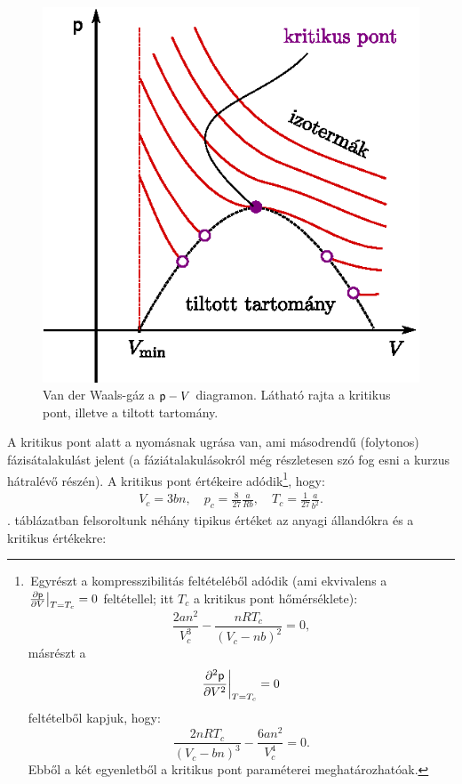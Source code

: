 \begin{figure}[htb]
    \centering
    \includegraphics{termo_4/termo_4_7.eps}
    \caption{Van der Waals-gáz a $\mathsf p-V$ diagramon. Látható rajta a kritikus pont, illetve a tiltott tartomány.}
    \label{fig:termo_4_7}
\end{figure}
A kritikus pont alatt a nyomásnak ugrása van, ami másodrendű (folytonos) fázisátalakulást jelent (a fáziátalakulásokról még részletesen szó fog esni a kurzus hátralévő részén). A kritikus pont értékeire adódik\footnote{\,Egyrészt a kompresszibilitás feltételéből adódik (ami ekvivalens a $\frac{\partial{\mathsf p}}{\partial{V}}\big|_{T=T_c}=0$ feltétellel; itt $T_c$ a kritikus pont hőmérséklete): $$ \frac{2an^2}{V_c^3}-\frac{nRT_c}{(V_c-nb)^2}=0,$$
másrészt a $$\frac{\partial^2\mathsf p}{\partial V^2}\bigg|_{T=T_c}=0$$ feltételből kapjuk, hogy:
$$\frac{2nRT_c}{(V_c-bn)^3}-\frac{6an^2}{V_c^4}=0.$$ Ebből a két egyenletből a kritikus pont paraméterei meghatározhatóak.}, hogy:
\begin{align}
    V_c = 3bn,\quad p_c = \frac{8}{27}\frac{a}{Rb},\quad T_c = \frac{1}{27}\frac{a}{b^2}.
\end{align}
. táblázatban felsoroltunk néhány tipikus értéket az anyagi állandókra és a kritikus értékekre:
